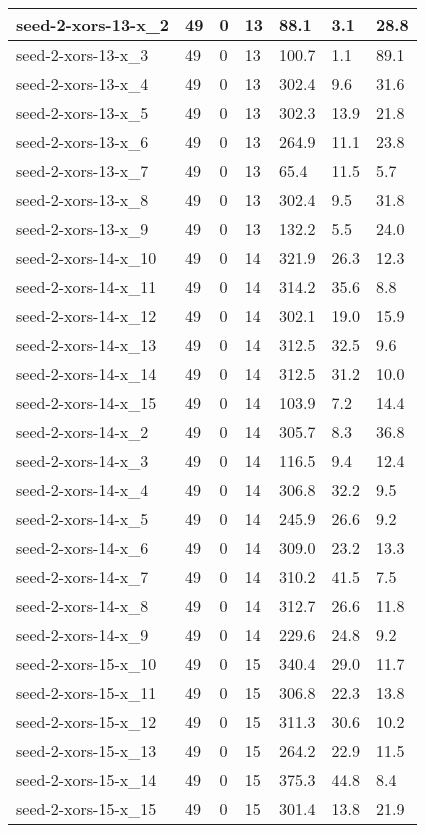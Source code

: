 \begin{scriptsize}
\begin{longtable}{|p{5cm}|l|l|l|l|l|l|}
seed-2-xors-13-x\_2&49&0&13&88.1&3.1&28.8 \\ \hline 
seed-2-xors-13-x\_3&49&0&13&100.7&1.1&89.1 \\ \hline 
seed-2-xors-13-x\_4&49&0&13&302.4&9.6&31.6 \\ \hline 
seed-2-xors-13-x\_5&49&0&13&302.3&13.9&21.8 \\ \hline 
seed-2-xors-13-x\_6&49&0&13&264.9&11.1&23.8 \\ \hline 
seed-2-xors-13-x\_7&49&0&13&65.4&11.5&5.7 \\ \hline 
seed-2-xors-13-x\_8&49&0&13&302.4&9.5&31.8 \\ \hline 
seed-2-xors-13-x\_9&49&0&13&132.2&5.5&24.0 \\ \hline 
seed-2-xors-14-x\_10&49&0&14&321.9&26.3&12.3 \\ \hline 
seed-2-xors-14-x\_11&49&0&14&314.2&35.6&8.8 \\ \hline 
seed-2-xors-14-x\_12&49&0&14&302.1&19.0&15.9 \\ \hline 
seed-2-xors-14-x\_13&49&0&14&312.5&32.5&9.6 \\ \hline 
seed-2-xors-14-x\_14&49&0&14&312.5&31.2&10.0 \\ \hline 
seed-2-xors-14-x\_15&49&0&14&103.9&7.2&14.4 \\ \hline 
seed-2-xors-14-x\_2&49&0&14&305.7&8.3&36.8 \\ \hline 
seed-2-xors-14-x\_3&49&0&14&116.5&9.4&12.4 \\ \hline 
seed-2-xors-14-x\_4&49&0&14&306.8&32.2&9.5 \\ \hline 
seed-2-xors-14-x\_5&49&0&14&245.9&26.6&9.2 \\ \hline 
seed-2-xors-14-x\_6&49&0&14&309.0&23.2&13.3 \\ \hline 
seed-2-xors-14-x\_7&49&0&14&310.2&41.5&7.5 \\ \hline 
seed-2-xors-14-x\_8&49&0&14&312.7&26.6&11.8 \\ \hline 
seed-2-xors-14-x\_9&49&0&14&229.6&24.8&9.2 \\ \hline 
seed-2-xors-15-x\_10&49&0&15&340.4&29.0&11.7 \\ \hline 
seed-2-xors-15-x\_11&49&0&15&306.8&22.3&13.8 \\ \hline 
seed-2-xors-15-x\_12&49&0&15&311.3&30.6&10.2 \\ \hline 
seed-2-xors-15-x\_13&49&0&15&264.2&22.9&11.5 \\ \hline 
seed-2-xors-15-x\_14&49&0&15&375.3&44.8&8.4 \\ \hline 
seed-2-xors-15-x\_15&49&0&15&301.4&13.8&21.9 \\ \hline 

\end{longtable}
\end{scriptsize}
